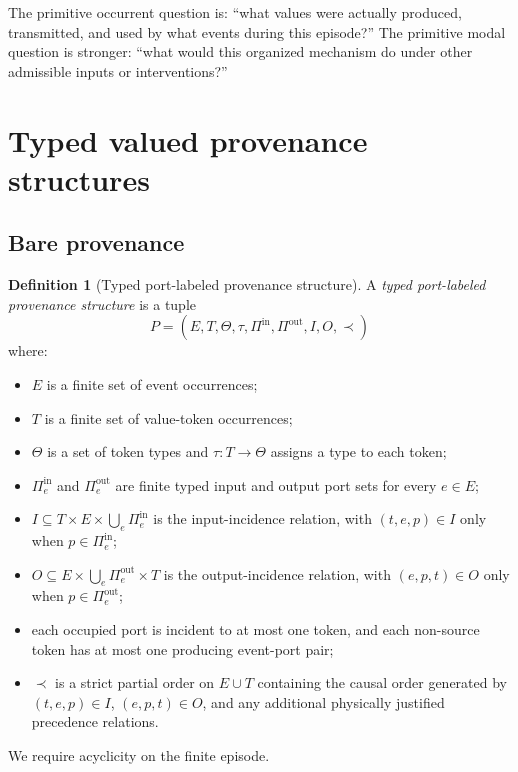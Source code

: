 \documentclass[11pt,a4paper]{article}
\theoremstyle{clean}
\theoremstyle{definition}
\newtheorem{definition}[theorem]{Definition}
\begin{document}
\begin{intuitionbox}
The primitive occurrent question is: ``what values were actually produced, transmitted, and used by what events during this episode?'' The primitive modal question is stronger: ``what would this organized mechanism do under other admissible inputs or interventions?''
\end{intuitionbox}

\section{Typed valued provenance structures}

\subsection{Bare provenance}

\begin{definition}[Typed port-labeled provenance structure]
A \emph{typed port-labeled provenance structure} is a tuple
\[
P=(E,T,\Theta,\tau,\Pi^{\mathrm{in}},\Pi^{\mathrm{out}},I,O,\prec)
\]
where:
\begin{itemize}
  \item $E$ is a finite set of event occurrences;
  \item $T$ is a finite set of value-token occurrences;
  \item $\Theta$ is a set of token types and $\tau:T\to\Theta$ assigns a type to each token;
  \item $\Pi^{\mathrm{in}}_e$ and $\Pi^{\mathrm{out}}_e$ are finite typed input and output port sets for every $e\in E$;
  \item $I\subseteq T\times E\times\bigcup_e\Pi^{\mathrm{in}}_e$ is the input-incidence relation, with $(t,e,p)\in I$ only when $p\in\Pi^{\mathrm{in}}_e$;
  \item $O\subseteq E\times\bigcup_e\Pi^{\mathrm{out}}_e\times T$ is the output-incidence relation, with $(e,p,t)\in O$ only when $p\in\Pi^{\mathrm{out}}_e$;
  \item each occupied port is incident to at most one token, and each non-source token has at most one producing event-port pair;
  \item $\prec$ is a strict partial order on $E\cup T$ containing the causal order generated by $(t,e,p)\in I$, $(e,p,t)\in O$, and any additional physically justified precedence relations.
\end{itemize}
We require acyclicity on the finite episode.
\end{definition}
\end{document}
